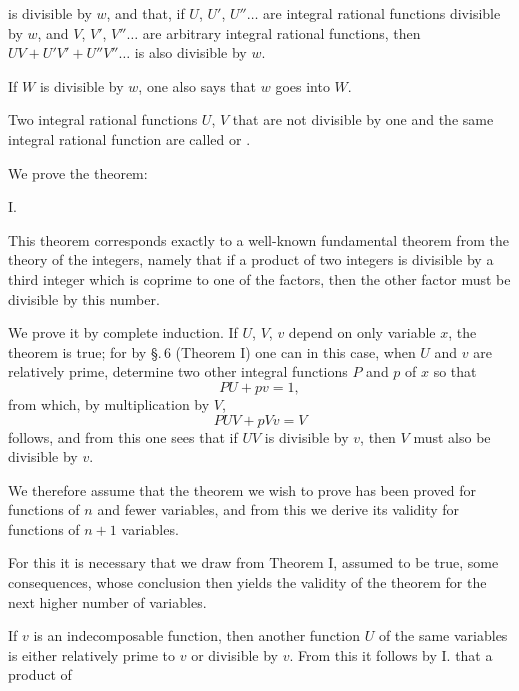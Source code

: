 is divisible by $w$, and that, if $U$, $U'$, $U''\ldots$ are integral rational
functions divisible by $w$, and $V$, $V'$, $V''\ldots$ are arbitrary integral
rational functions, then $UV + U'V' + U''V''\ldots$ is also divisible by $w$.

If $W$ is divisible by $w$, one also says that $w$ goes into $W$.

Two integral rational functions $U$, $V$ that are not divisible by one and the
same integral rational function are called 
or .

We prove the theorem:

I. 

This theorem corresponds exactly to a well-known fundamental theorem from the
theory of the integers, namely that if a product of two integers is divisible
by a third integer which is coprime to one of the factors, then the other
factor must be divisible by this number.

We prove it by complete induction. If $U$, $V$, $v$ depend on only
 variable $x$, the theorem is true; for by \S.\,6 (Theorem I)
one can in this case, when $U$ and $v$ are relatively prime, determine two
other integral functions $P$ and $p$ of $x$ so that
\[
PU + pv = 1,
\]
from which, by multiplication by $V$,
\[
PUV + pVv = V
\]
follows, and from this one sees that if $UV$ is divisible by $v$, then $V$
must also be divisible by $v$.

We therefore assume that the theorem we wish to prove has been proved for
functions of $n$ and fewer variables, and from this we derive its validity
for functions of $n + 1$ variables.

For this it is necessary that we draw from Theorem I, assumed to be true,
some consequences, whose conclusion then yields the validity of the theorem
for the next higher number of variables.

If $v$ is an indecomposable function, then another function $U$ of the same
variables is either relatively prime to $v$ or divisible by $v$. From this it
follows by I. that a product of
